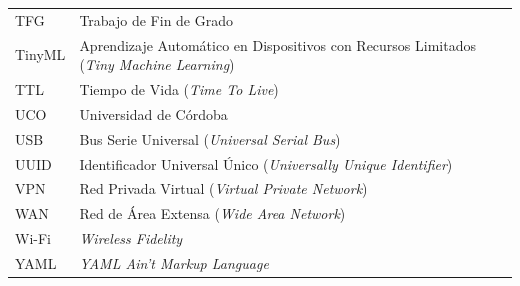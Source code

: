 \begin{longtable}{|l|p{10cm}|}
TFG & Trabajo de Fin de Grado \\
TinyML & Aprendizaje Automático en Dispositivos con Recursos Limitados (\textit{Tiny Machine Learning}) \\
TTL & Tiempo de Vida (\textit{Time To Live}) \\
UCO & Universidad de Córdoba \\
USB & Bus Serie Universal (\textit{Universal Serial Bus}) \\
UUID & Identificador Universal Único (\textit{Universally Unique Identifier}) \\
VPN & Red Privada Virtual (\textit{Virtual Private Network}) \\
WAN & Red de Área Extensa (\textit{Wide Area Network}) \\
Wi-Fi & \textit{Wireless Fidelity} \\
YAML & \textit{YAML Ain't Markup Language} \\
\end{longtable}
